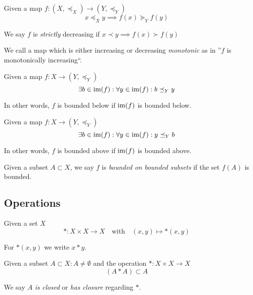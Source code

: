 \begin{definition}
   Given a map \(f: (X, \preceq_X) \to (Y, \preceq_Y)\)
   \[x \preceq_X y \implies f(x) \succeq_Y f(y)\]
\end{definition}
\begin{remark}
   We say \(f\) is \textit{strictly} decreasing if \(x \prec y \implies f(x) \succ f(y)\)
\end{remark}

\begin{remark}[Monotonic]
   We call a map which is either increasing or decreasing \textit{monotonic} as in ''\(f\) is monotonically increasing``.
\end{remark}

\begin{definition}
   Given a map \(f: X \to (Y, \preceq_Y)\)
   \[\exists b \in \operatorname{im}(f): \forall y \in \operatorname{im}(f): b \preceq_Y y\]
\end{definition}
\begin{remark}
   In other words, \(f\) is bounded below if \(\operatorname{im}(f)\) is bounded below.
\end{remark}

\begin{definition}
   Given a map \(f: X \to (Y, \preceq_Y)\)
   \[\exists b \in \operatorname{im}(f): \forall y \in \operatorname{im}(f): y \preceq_Y b\]
\end{definition}
\begin{remark}
   In other words, \(f\) is bounded above if \(\operatorname{im}(f)\) is bounded above.
\end{remark}
\begin{remark}
   Given a subset \(A \subset X\), we say \(f\) is \textit{bounded on bounded subsets} if the set \(f(A)\) is bounded.
\end{remark}

\subsection{Operations}
\begin{definition}[Operation]
   Given a set \(X\)
   \[\ast: X \times X \to X \quad\text{with}\quad (x, y) \mapsto \ast(x, y)\]
\end{definition}
\begin{remark}[Notation]
   For \(\ast(x, y)\) we write \(x \ast y\).
\end{remark}

\begin{definition}
   Given a subset \(A \subset X: A \neq \emptyset\) and the operation \(*: X \times X \to X\)
   \[(A \ast A) \subset A\]
\end{definition}
\begin{remark}
   We say \(A\) \emph{is closed} or \emph{has closure} regarding \(\ast\).
\end{remark}

